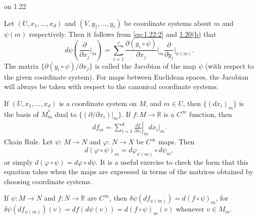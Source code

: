 \begin{remarks}{on 1.22}\label{thm:1.23}
	\begin{enumerate}
		 Let $(U, x_{1}, \ldots, x_{d})$ and $(V, y_{1}, \ldots, y_{c})$
		be coordinate systems about $m$ and $\psi(m)$
		respectively. Then it follows from \eqref{eq:1.22:2}
		and \hyperref[thm:1.20]{1.20(b)} that
		\[
			d\psi\left(\frac{\partial}{\partial x_{j}}\bigg|_{m}\right)=\sum_{i=1}^{c}\frac{\partial(y_{i}\circ\psi)}{\partial x_{j}}\bigg|_{m}\frac{\partial}{\partial y_{i}}\bigg|_{\psi(m)}.
		\]
		The matrix $\{\partial(y_{i}\circ\psi)/\partial x_{j}\}$ is called the
		Jacobian of the map $\psi$ (with respect to the given coordinate system).
		For maps between Euclidean spaces, the Jacobian will always be taken
		with respect to the canonical coordinate systems. 

		 If $(U, x_1, \ldots, x_d)$ is a coordinate system on $M$,
		and $m \in U$, then $\{(dx_i)_m\}$ is the basis of $M_m^*$ dual
		to $\{(\partial/\partial x_i)|_m\}$. If $f: M \to \mathbb{R}$
		is a $C^\infty$ function, then
		\[
			\begin{array}{r}{d f_{m}=\left.\sum_{i=1}^{d}\frac{\partial f}{\partial x_{i}}\right|_{m}d x_{i}|_{m}.}\end{array}
		\]
		 Chain Rule. Let  $ \psi $:  $ M \to N $ and  $ \varphi $:  $ N \to X $
		be  $ C^\infty $ maps. Then 
		\[
			d(\varphi\circ\psi)_{m}=d\varphi_{\psi(m)}\circ d\psi_{m},
		\]
		or simply $d(\varphi\circ\psi)=d\varphi\circ d\psi$. It is a useful
		exercise to check the form that this equation takes when the maps are
		expressed in terms of the matrices obtained by choosing coordinate systems.

		 If $\psi: M \to N$ and $f: N \to \mathbb{R}$ are $C^\infty$, then $\delta\psi(df_{\psi(m)}) = d(f \circ \psi)_m$,
		for $\delta\psi(df_{\psi(m)})(v) = df(d\psi(v)) = d(f \circ \psi)_m(v)$ whenever $v \in M_m$.


\end{enumerate}
\end{remarks}
